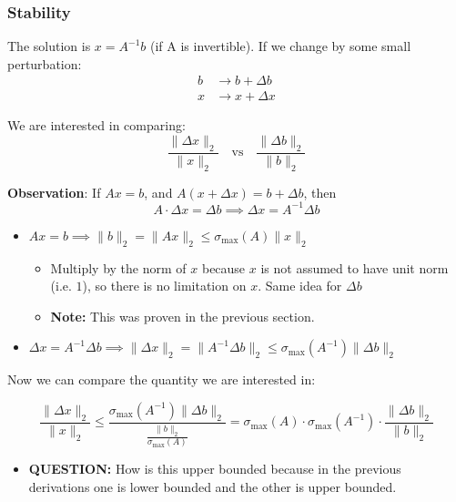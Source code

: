 \subsubsection{Stability}
\begin{derivation}
        The solution is \( x = A^{-1} b \) (if A is invertible). If we change by some small perturbation:
        \begin{align*}
        b &\rightarrow b + \Delta b \\
        x &\rightarrow x + \Delta x
        \end{align*}
    
        We are interested in comparing:
        \begin{equation*}
        \frac{\|\Delta x\|_2}{\|x\|_2} \quad \text{vs} \quad \frac{\|\Delta b\|_2}{\|b\|_2}
        \end{equation*}
        \vspace{1em}

    \textbf{Observation}: If \( Ax = b \), and \( A(x + \Delta x) = b + \Delta b \), then 
\[
A \cdot \Delta x = \Delta b \implies \Delta x = A^{-1} \Delta b
\]
\begin{itemize}
    \item \( Ax = b \implies \| b \|_2 = \| A x \|_2 \leq \sigma_{\max}(A) \| x \|_2 \)
    \begin{itemize}
        \item Multiply by the norm of $x$ because $x$ is not assumed to have unit norm (i.e. $1$), so there is no limitation on $x$. Same idea for $\Delta b$
        \item \textbf{Note:} This was proven in the previous section.
    \end{itemize}
    \item \( \Delta x = A^{-1} \Delta b \implies \| \Delta x \|_2 = \| A^{-1} \Delta b \|_2 \leq \sigma_{\max}(A^{-1}) \| \Delta b \|_2 \)
\end{itemize}
\vspace{1em}

Now we can compare the quantity we are interested in: 

\begin{equation*}
    \frac{\|\Delta x\|_2}{\|x\|_2} \leq \frac{\sigma_{\max}(A^{-1}) \|\Delta b\|_2}{\frac{\|b\|_2}{\sigma_{\max}(A)}} 
    = \sigma_{\max}(A) \cdot \sigma_{\max}(A^{-1}) \cdot \frac{\|\Delta b\|_2}{\|b\|_2}
\end{equation*}
\begin{itemize}
    \item \textbf{QUESTION:} How is this upper bounded because in the previous derivations one is lower bounded and the other is upper bounded. 
\end{itemize}


\end{derivation}
